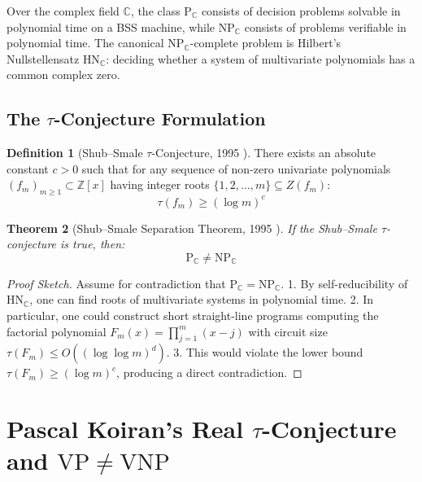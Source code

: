 \documentclass[11pt,a4paper]{article}
\newtheorem{theorem}{Theorem}[section]
\theoremstyle{definition}
\newtheorem{definition}[theorem]{Definition}
\begin{document}
Over the complex field $\mathbb{C}$, the class $\text{P}_{\mathbb{C}}$ consists of decision problems solvable in polynomial time on a BSS machine, while $\text{NP}_{\mathbb{C}}$ consists of problems verifiable in polynomial time. The canonical $\text{NP}_{\mathbb{C}}$-complete problem is Hilbert's Nullstellensatz $\text{HN}_{\mathbb{C}}$: deciding whether a system of multivariate polynomials has a common complex zero.

\subsection{The $\tau$-Conjecture Formulation}

\begin{definition}[Shub--Smale $\tau$-Conjecture, 1995 \cite{shub1995}]\label{def:shub_smale_tau}
There exists an absolute constant $c > 0$ such that for any sequence of non-zero univariate polynomials $(f_m)_{m \ge 1} \subset \mathbb{Z}[x]$ having integer roots $\{1, 2, \dots, m\} \subseteq Z(f_m)$:
\begin{equation}\label{eq:shub_smale_tau}
\tau(f_m) \ge (\log m)^c
\end{equation}
\end{definition}

\begin{theorem}[Shub--Smale Separation Theorem, 1995 \cite{shub1995}]\label{thm:bss_separation}
If the Shub--Smale $\tau$-conjecture is true, then:
\begin{equation}\label{eq:bss_p_ne_np}
\mathrm{P}_{\mathbb{C}} \ne \mathrm{NP}_{\mathbb{C}}
\end{equation}
\end{theorem}

\begin{proof}[Proof Sketch]
Assume for contradiction that $\text{P}_{\mathbb{C}} = \text{NP}_{\mathbb{C}}$.
1. By self-reducibility of $\text{HN}_{\mathbb{C}}$, one can find roots of multivariate systems in polynomial time.
2. In particular, one could construct short straight-line programs computing the factorial polynomial $F_m(x) = \prod_{j=1}^m (x - j)$ with circuit size $\tau(F_m) \le O((\log \log m)^d)$.
3. This would violate the lower bound $\tau(F_m) \ge (\log m)^c$, producing a direct contradiction.
\end{proof}

\section{Pascal Koiran's Real $\tau$-Conjecture and $\mathrm{VP} \ne \mathrm{VNP}$}
\end{document}
